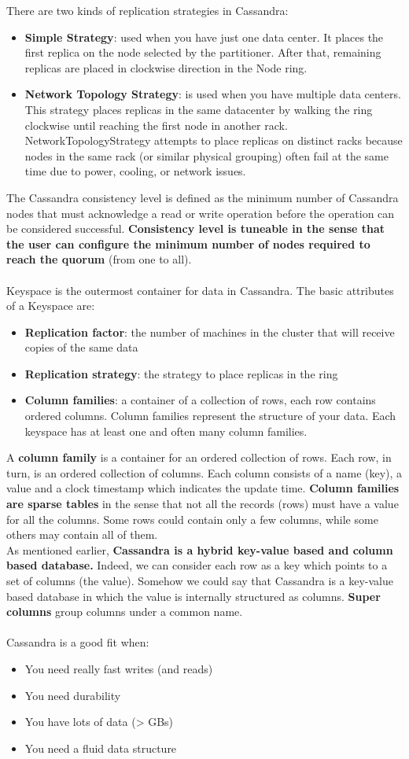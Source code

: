 \documentclass[10pt,a4paper]{article}
\newcommand{\nline}{\\~\\}
\begin{document}
\pagebreak
There are two kinds of replication strategies in Cassandra:
\begin{itemize}
	\item \textbf{Simple Strategy}: used when you have just one data center. It places the first replica on the node selected by the partitioner. After that, remaining replicas are placed in clockwise direction in the Node ring.
	\item \textbf{Network Topology Strategy}: is used when you have multiple data centers. This strategy places replicas in the same datacenter by walking the ring clockwise until reaching the first node in another rack. NetworkTopologyStrategy attempts to place replicas on distinct racks because nodes in the same rack (or similar physical grouping) often fail at the same time due to power, cooling, or network issues.
\end{itemize}
The Cassandra consistency level is defined as the minimum number of Cassandra nodes that must acknowledge a read or write operation before the operation can be considered successful. \textbf{Consistency level is tuneable in the sense that the user can configure the minimum number of nodes required to reach the quorum} (from one to all).
\nline
Keyspace is the outermost container for data in Cassandra. The basic attributes of a Keyspace are: 
\begin{itemize}
	\item \textbf{Replication factor}: the number of machines in the cluster that will receive copies of the same data
	\item \textbf{Replication strategy}: the strategy to place replicas in the ring
	\item \textbf{Column families}: a container of a collection of rows, each row contains ordered columns. Column families represent the structure of your data. Each keyspace has at least one and often many column families.
\end{itemize}
A\textbf{ column family} is a container for an ordered collection of rows. Each row, in turn, is an ordered collection of columns. Each column consists of a name (key), a value and a clock timestamp which indicates the update time. \textbf{Column families are sparse tables} in the sense that not all the records (rows) must have a value for all the columns. Some rows could contain only a few columns, while some others may contain all of them.  \\
As mentioned earlier, \textbf{Cassandra is a hybrid key-value based and column based database.} Indeed, we can consider each row as a key which points to a set of columns (the value). Somehow we could say that Cassandra is a key-value based database in which the value is internally structured as columns.
\textbf{Super columns} group columns under a common name.
\nline
Cassandra is a good fit when:
\begin{itemize}
	\item You need really fast writes (and reads)
	\item You need durability
	\item You have lots of data (> GBs)
	\item You need a fluid data structure
\end{itemize}
\end{document}
